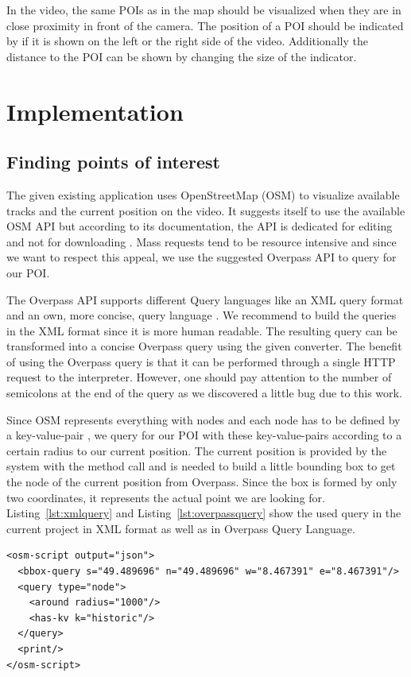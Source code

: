 \documentclass[journal]{IEEEtran}
\begin{document}
In the video, the same POIs as in the map should be visualized when they are in close proximity in front of the camera. The position of a POI should be indicated by if it is shown on the left or the right side of the video. Additionally the distance to the POI can be shown by changing the size of the indicator.

\section{Implementation}

\subsection{Finding points of interest}

The given existing application uses OpenStreetMap (OSM) to visualize available tracks and the current position on the video. It suggests itself to use the available OSM API but according to its documentation, the API is dedicated for editing and not for downloading \cite{osmdata}. Mass requests tend to be resource intensive and since we want to respect this appeal, we use the suggested Overpass API to query for our POI.

The Overpass API supports different Query languages like an XML query format and an own, more concise, query language \cite{overpass-lang}. We recommend to build the queries in the XML format since it is more human readable. The resulting query can be transformed into a concise Overpass query using the given converter. The benefit of using the Overpass query is that it can be performed through a single HTTP request to the interpreter. However, one should pay attention to the number of semicolons at the end of the query as we discovered a little bug due to this work.

Since OSM represents everything with nodes and each node has to be defined by a key-value-pair \cite{osmfeature}, we query for our POI with these key-value-pairs according to a certain radius to our current position. 
The current position is provided by the system with the method call and is needed to build a little bounding box to get the node of the current position from Overpass. Since the box is formed by only two coordinates, it represents the actual point we are looking for. Listing~\ref{lst:xmlquery} and Listing~\ref{lst:overpassquery} show the used query in the current project in XML format as well as in Overpass Query Language.

\begin{lstlisting}[caption={Overpass~query~in~XML~format},label={lst:xmlquery}]
<osm-script output="json">
  <bbox-query s="49.489696" n="49.489696" w="8.467391" e="8.467391"/>
  <query type="node">
    <around radius="1000"/>
    <has-kv k="historic"/>
  </query>
  <print/>
</osm-script>
\end{lstlisting}
\end{document}

